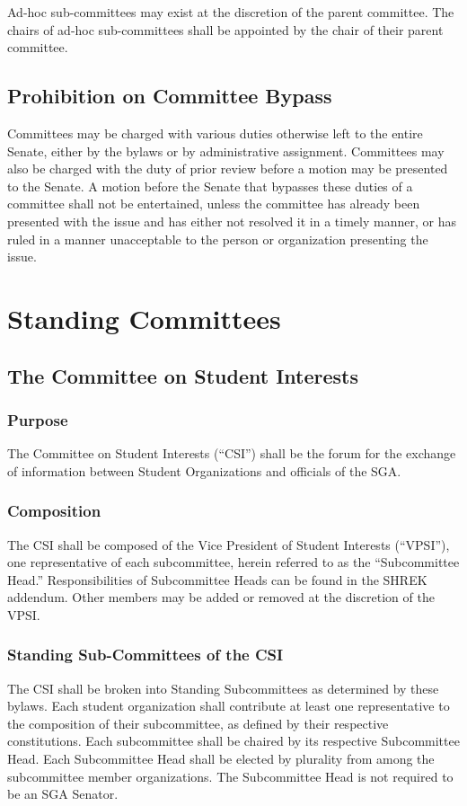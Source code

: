 \documentclass[12pt]{scrreprt}
\begin{document}
Ad-hoc sub-committees may exist at the discretion of the parent committee. The 
chairs of ad-hoc sub-committees shall be appointed by the chair of their 
parent committee.

\section{Prohibition on Committee Bypass}
Committees may be charged with various duties otherwise left to the entire 
Senate, either by the bylaws or by administrative assignment. Committees may 
also be charged with the duty of prior review before a motion may be presented 
to the Senate. A motion before the Senate that bypasses these duties of a 
committee shall not be entertained, unless the committee has already been 
presented with the issue and has either not resolved it in a timely manner, or 
has ruled in a manner unacceptable to the person or organization presenting 
the issue.

\chapter{Standing Committees}

\section{The Committee on Student Interests} \label{sec:csi_representative}

\subsection{Purpose}
The Committee on Student Interests (“CSI”) shall be the forum for the exchange of
information between Student Organizations and officials of the SGA.

\subsection{Composition}
The CSI shall be composed of the Vice President of Student Interests (“VPSI”), one
representative of each subcommittee, herein referred to as the “Subcommittee Head.”
Responsibilities of Subcommittee Heads can be found in the SHREK addendum. Other
members may be added or removed at the discretion of the VPSI.

\subsection{Standing Sub-Committees of the CSI} \label{sec:csi_subcommittees}
The CSI shall be broken into Standing Subcommittees as determined by these bylaws. Each
student organization shall contribute at least one representative to the composition of their
subcommittee, as defined by their respective constitutions. Each subcommittee shall be
chaired by its respective Subcommittee Head. Each Subcommittee Head shall be elected by
plurality from among the subcommittee member organizations. The Subcommittee Head is
not required to be an SGA Senator.
\end{document}
